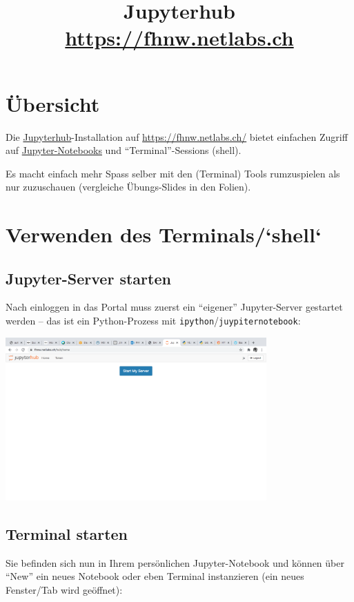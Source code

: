 \documentclass[]{scrartcl}
\begin{document}
\title{Jupyterhub \\ \url{https://fhnw.netlabs.ch}}
\maketitle

\section{\"Ubersicht}

Die \href{https://jupyter.org/hub}{Jupyterhub}-Installation auf \url{https://fhnw.netlabs.ch/} bietet einfachen Zugriff auf \href{}{Jupyter-Notebooks} und ``Terminal''-Sessions (shell).

Es macht einfach mehr Spass selber mit den (Terminal) Tools rumzuspielen als
nur zuzuschauen (vergleiche \"Ubungs-Slides in den Folien).

\section{Verwenden des Terminals/`shell`}

\subsection*{Jupyter-Server starten}
Nach einloggen in das Portal muss zuerst ein ``eigener'' Jupyter-Server gestartet werden -- das ist ein Python-Prozess mit \texttt{ipython}/\texttt{juypiternotebook}:

\includegraphics[width=10cm]{jupyterhub/jupyterhub_start_server}

\subsection*{Terminal starten}
Sie befinden sich nun in Ihrem pers\"onlichen Jupyter-Notebook und k\"onnen
\"uber ``New'' ein neues Notebook oder eben Terminal instanzieren (ein neues Fenster/Tab wird ge\"offnet):
\end{document}
